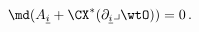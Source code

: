 \begin{equation}\label{dA}
 \md(A_{\underline{i}}+\CX^\ast(\partial_{\underline{i}}\lrcorner\wtO))=0\,.  
\end{equation} 

